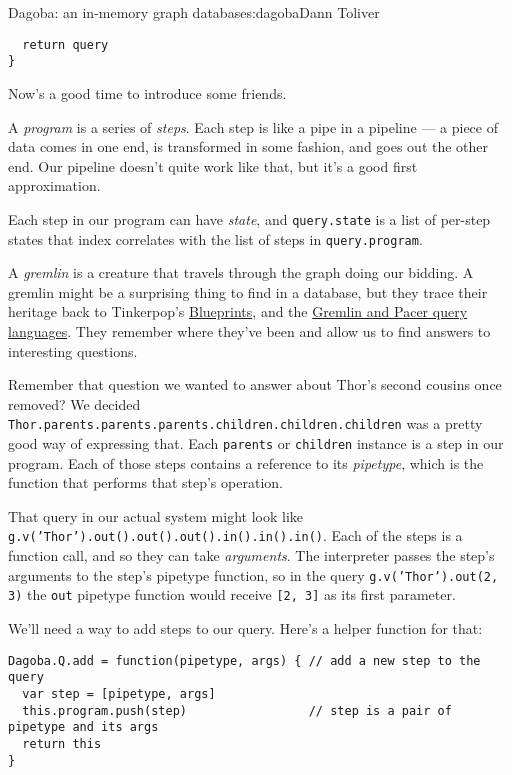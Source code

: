 \begin{aosachapter}{Dagoba: an in-memory graph database}{s:dagoba}{Dann Toliver}
\begin{verbatim}
  return query
}
\end{verbatim}

Now's a good time to introduce some friends.

A \emph{program} is a series of \emph{steps}. Each step is like a pipe
in a pipeline --- a piece of data comes in one end, is transformed in
some fashion, and goes out the other end. Our pipeline doesn't quite
work like that, but it's a good first approximation.

Each step in our program can have \emph{state}, and \texttt{query.state}
is a list of per-step states that index correlates with the list of
steps in \texttt{query.program}.

A \emph{gremlin} is a creature that travels through the graph doing our
bidding. A gremlin might be a surprising thing to find in a database,
but they trace their heritage back to Tinkerpop's
\href{http://euranova.eu/upl_docs/publications/an-empirical-comparison-of-graph-databases.pdf}{Blueprints},
and the
\href{http://edbt.org/Proceedings/2013-Genova/papers/workshops/a29-holzschuher.pdf}{Gremlin
and Pacer query languages}. They remember where they've been and allow
us to find answers to interesting questions.

Remember that question we wanted to answer about Thor's second cousins
once removed? We decided
\texttt{Thor.parents.parents.parents.children.children.children} was a
pretty good way of expressing that. Each \texttt{parents} or
\texttt{children} instance is a step in our program. Each of those steps
contains a reference to its \emph{pipetype}, which is the function that
performs that step's operation.

That query in our actual system might look like
\texttt{g.v('Thor').out().out().out().in().in().in()}. Each of the steps
is a function call, and so they can take \emph{arguments}. The
interpreter passes the step's arguments to the step's pipetype function,
so in the query \texttt{g.v('Thor').out(2, 3)} the \texttt{out} pipetype
function would receive \texttt{{[}2, 3{]}} as its first parameter.

We'll need a way to add steps to our query. Here's a helper function for
that:

\begin{verbatim}
Dagoba.Q.add = function(pipetype, args) { // add a new step to the query
  var step = [pipetype, args]
  this.program.push(step)                 // step is a pair of pipetype and its args
  return this
}
\end{verbatim}


\end{aosachapter}
